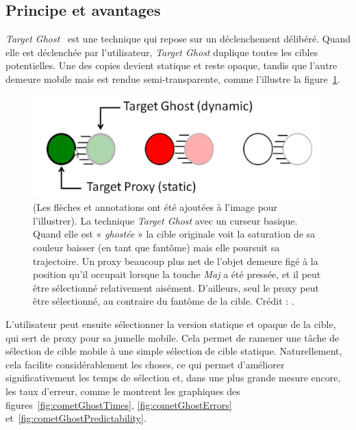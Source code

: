 	\subsection{Principe et avantages}
	\emph{Target Ghost}~\cite{hasan2011comet} est une technique qui repose sur un déclenchement délibéré. Quand elle est déclenchée par l'utilisateur, \emph{Target Ghost} duplique toutes les cibles potentielles. Une des copies devient statique et reste opaque, tandis que l'autre demeure mobile mais est rendue semi-transparente, comme l'illustre la figure~\ref{fig:targetGhost}.
	
	\begin{figure}[H]
		\centering
		\includegraphics[width=\textwidth]{figures/ch2/targetGhost}
		\caption[La technique \emph{Target Ghost}]{(Les flèches et annotations ont été ajoutées à l'image pour l'illustrer). La technique \emph{Target Ghost} avec un curseur basique. Quand elle est « \emph{ghostée} » la cible originale voit la saturation de sa couleur baisser (en tant que fantôme) mais elle poursuit sa trajectoire. Un proxy beaucoup plus net de l'objet demeure figé à la position qu'il occupait lorsque la touche \emph{Maj} a été pressée, et il peut être sélectionné relativement aisément. D'ailleurs, seul le proxy peut être sélectionné, au contraire du fantôme de la cible. Crédit : \cite{hasan2011comet}.}
		\label{fig:targetGhost}
	\end{figure}
	
	L'utilisateur peut ensuite sélectionner la version statique et opaque de la cible, qui sert de proxy pour sa jumelle mobile. Cela permet de ramener une tâche de sélection de cible mobile à une simple sélection de cible statique. Naturellement, cela facilite considérablement les choses, ce qui permet d'améliorer significativement les temps de sélection et, dans une plus grande mesure encore, les taux d'erreur, comme le montrent les graphiques des figures~\ref{fig:cometGhostTimes}, \ref{fig:cometGhostErrors} et~\ref{fig:cometGhostPredictability}.

